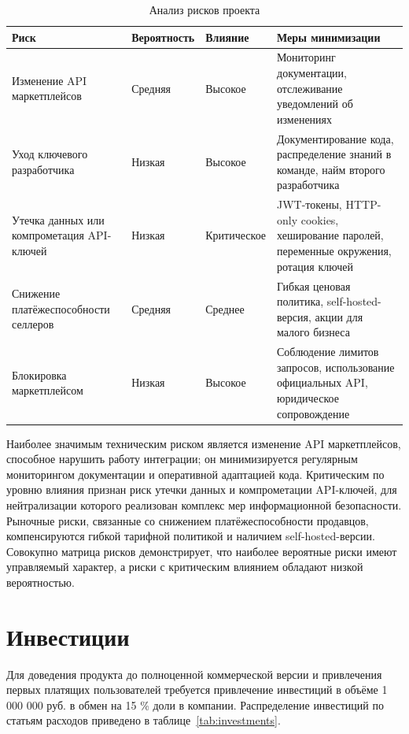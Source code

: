 \begin{table}[H]
\caption{Анализ рисков проекта}
\label{tab:risks}
\begin{center}
\vspace{-0.5cm}\begin{tabular}{|p{3cm}|p{2.75cm}|p{2.75cm}|p{6cm}|}
\hline
Риск & Вероятность & Влияние & Меры минимизации \\ \hline
Изменение API маркетплейсов & Средняя & Высокое & Мониторинг документации, отслеживание уведомлений об изменениях \\ \hline
Уход ключевого разработчика & Низкая & Высокое & Документирование кода, распределение знаний в команде, найм второго разработчика \\ \hline
Утечка данных или компрометация API-ключей & Низкая & Критическое & JWT-токены, HTTP-only cookies, хеширование паролей, переменные окружения, ротация ключей \\ \hline
Снижение платёжеспособности селлеров & Средняя & Среднее & Гибкая ценовая политика, self-hosted-версия, акции для малого бизнеса \\ \hline
Блокировка маркетплейсом & Низкая & Высокое & Соблюдение лимитов запросов, использование официальных API, юридическое сопровождение \\ \hline
\end{tabular}
\end{center}
\end{table}

Наиболее значимым техническим риском является изменение API маркетплейсов, способное нарушить работу интеграции; он минимизируется регулярным мониторингом документации и оперативной адаптацией кода. Критическим по уровню влияния признан риск утечки данных и компрометации API-ключей, для нейтрализации которого реализован комплекс мер информационной безопасности. Рыночные риски, связанные со снижением платёжеспособности продавцов, компенсируются гибкой тарифной политикой и наличием self-hosted-версии. Совокупно матрица рисков демонстрирует, что наиболее вероятные риски имеют управляемый характер, а риски с критическим влиянием обладают низкой вероятностью.

\section{Инвестиции}

Для доведения продукта до полноценной коммерческой версии и привлечения первых платящих пользователей требуется привлечение инвестиций в объёме 1 000 000 руб. в обмен на 15 \% доли в компании. Распределение инвестиций по статьям расходов приведено в таблице~\ref{tab:investments}.


